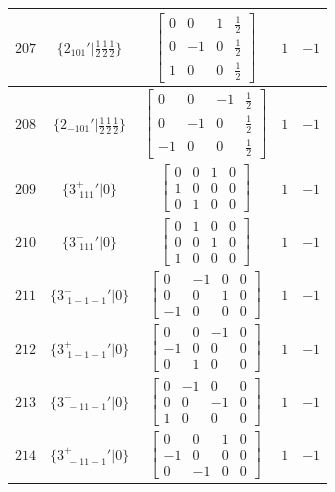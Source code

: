 \documentclass[fleqn,8pt]{jsarticle}
\begin{document}
\begin{longtable}{ccccc}
$ 207 $ & $ \{2{}_{101}{}'|\frac{1}{2} \frac{1}{2} \frac{1}{2}\} $ & $ \begin{bmatrix} 0 & 0 & 1 & \frac{1}{2} \\ 0 & -1 & 0 & \frac{1}{2} \\ 1 & 0 & 0 & \frac{1}{2} \end{bmatrix} $ & $ 1 $ & $ -1 $ \\ \hline
$ 208 $ & $ \{2{}_{-101}{}'|\frac{1}{2} \frac{1}{2} \frac{1}{2}\} $ & $ \begin{bmatrix} 0 & 0 & -1 & \frac{1}{2} \\ 0 & -1 & 0 & \frac{1}{2} \\ -1 & 0 & 0 & \frac{1}{2} \end{bmatrix} $ & $ 1 $ & $ -1 $ \\ \hline
$ 209 $ & $ \{3^{+}_{\,\,111}{}'|0\} $ & $ \begin{bmatrix} 0 & 0 & 1 & 0 \\ 1 & 0 & 0 & 0 \\ 0 & 1 & 0 & 0 \end{bmatrix} $ & $ 1 $ & $ -1 $ \\ \hline
$ 210 $ & $ \{3^{-}_{\,\,111}{}'|0\} $ & $ \begin{bmatrix} 0 & 1 & 0 & 0 \\ 0 & 0 & 1 & 0 \\ 1 & 0 & 0 & 0 \end{bmatrix} $ & $ 1 $ & $ -1 $ \\ \hline
$ 211 $ & $ \{3^{-}_{\,\,1-1-1}{}'|0\} $ & $ \begin{bmatrix} 0 & -1 & 0 & 0 \\ 0 & 0 & 1 & 0 \\ -1 & 0 & 0 & 0 \end{bmatrix} $ & $ 1 $ & $ -1 $ \\ \hline
$ 212 $ & $ \{3^{+}_{\,\,1-1-1}{}'|0\} $ & $ \begin{bmatrix} 0 & 0 & -1 & 0 \\ -1 & 0 & 0 & 0 \\ 0 & 1 & 0 & 0 \end{bmatrix} $ & $ 1 $ & $ -1 $ \\ \hline
$ 213 $ & $ \{3^{-}_{\,\,-11-1}{}'|0\} $ & $ \begin{bmatrix} 0 & -1 & 0 & 0 \\ 0 & 0 & -1 & 0 \\ 1 & 0 & 0 & 0 \end{bmatrix} $ & $ 1 $ & $ -1 $ \\ \hline
$ 214 $ & $ \{3^{+}_{\,\,-11-1}{}'|0\} $ & $ \begin{bmatrix} 0 & 0 & 1 & 0 \\ -1 & 0 & 0 & 0 \\ 0 & -1 & 0 & 0 \end{bmatrix} $ & $ 1 $ & $ -1 $ \\ \hline

\end{longtable}
\end{document}
